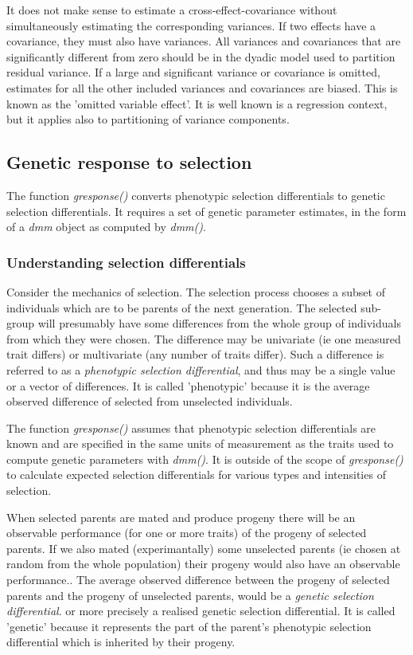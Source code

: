 \documentclass[titlepage]{article}  %
\begin{document}
	It does not make sense to estimate a cross-effect-covariance without simultaneously estimating the corresponding variances. If two effects have a covariance, they must also have variances. All variances and covariances that are significantly different from zero should be in the dyadic model used to partition residual variance. If a large and significant variance or covariance is omitted, estimates for all the other included variances and covariances are biased. This is known as the 'omitted variable effect'. It is well known is a regression context, but it applies also to partitioning of variance components.



\clearpage
\subsection{Genetic response to selection}

The function {\em gresponse()} converts phenotypic selection differentials to genetic selection differentials. It requires a set of genetic parameter estimates, in the form of a {\em dmm} object as computed by {\em dmm()}.

\subsubsection{Understanding selection differentials}
 Consider the mechanics of selection. The selection process chooses a subset of individuals which are to be parents of the next generation. The selected sub-group will presumably have some differences from the whole group of individuals from which they were chosen. The difference may be univariate (ie one measured trait differs) or multivariate (any number of traits differ). Such a difference is referred to as a {\em phenotypic selection differential}, and thus may be a single value or a vector of differences. It is called 'phenotypic' because it is the average observed difference of selected from unselected individuals.

The function {\em gresponse()} assumes that phenotypic selection differentials are known and are specified in the same units of measurement as the traits used to compute genetic parameters with {\em dmm()}. It is outside of the scope of {\em gresponse()} to calculate expected selection differentials for various types and intensities of selection.

When selected parents are mated and produce progeny there will be an observable performance (for one or more traits) of the progeny of selected parents. If we also mated (experimantally) some unselected parents (ie chosen at random from the whole population) their progeny would also have an observable performance.. The average observed difference between the progeny of selected parents and the progeny of unselected parents, would be a {\em genetic selection differential}. or more precisely a realised genetic selection differential. It is called 'genetic' because it represents the part of the parent's phenotypic selection differential which is inherited by their progeny.
\end{document}
